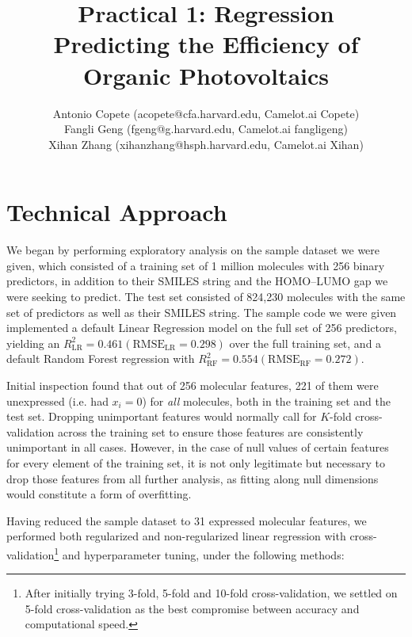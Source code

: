 \documentclass[11pt]{article}
\title{Practical 1: Regression \\ Predicting the Efficiency of Organic Photovoltaics}
\author{Antonio Copete (acopete@cfa.harvard.edu, Camelot.ai Copete) \\
	Fangli Geng (fgeng@g.harvard.edu, Camelot.ai fangligeng) \\
	Xihan Zhang (xihanzhang@hsph.harvard.edu, Camelot.ai Xihan)}
\begin{document}
\maketitle{}



\section{Technical Approach}

We began by performing exploratory analysis on the sample dataset we were given, which consisted of a training set of 1 million molecules with 256 binary predictors, in addition to their SMILES string and the HOMO--LUMO gap we were seeking to predict. The test set consisted of 824,230 molecules with the same set of predictors as well as their SMILES string. The sample code we were given implemented a default Linear Regression model on the full set of 256 predictors, yielding an $R_\textrm{LR}^2 = 0.461 (\textrm{RMSE}_\textrm{LR} = 0.298)$ over the full training set, and a default Random Forest regression with $R_\textrm{RF}^2 = 0.554 (\textrm{RMSE}_\textrm{RF} = 0.272)$.

Initial inspection found that out of 256 molecular features, 221 of them were unexpressed (i.e. had $x_i = 0$) for \emph{all} molecules, both in the training set and the test set. Dropping unimportant features would normally call for $K$-fold cross-validation across the training set to ensure those features are consistently unimportant in all cases. However, in the case of null values of certain features for every element of the training set, it is not only legitimate but necessary to drop those features from all further analysis, as fitting along null dimensions would constitute a form of overfitting.

Having reduced the sample dataset to 31 expressed molecular features, we performed both regularized and non-regularized linear regression with cross-validation\footnote{After initially trying 3-fold, 5-fold and 10-fold cross-validation, we settled on 5-fold cross-validation as the best compromise between accuracy and computational speed.} and hyperparameter tuning, under the following methods:
\end{document}
